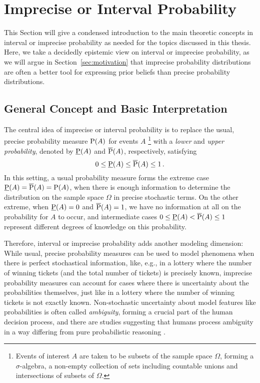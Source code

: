 

\section{Imprecise or Interval Probability}
\label{sec:ip-intro}

This Section will give a condensed introduction to the main theoretic concepts
in interval or imprecise probability as needed for the topics discussed in this thesis.
Here, we take a decidedly epistemic view on interval or imprecise probability,
as we will argue in Section~\ref{sec:motivation}
that imprecise probability distributions are often a better tool for expressing prior beliefs
than precise probability distributions.



\subsection{General Concept and Basic Interpretation}
\label{sec:ip-general}

The central idea of imprecise or interval probability \parencite{1991:walley, 2001:weichselberger, 2011:IESS-ip} is
to replace the usual, precise probability measure $\operatorname{P}(A)$ for events $A$%
\footnote{Events of interest $A$ are taken to be subsets of the sample space $\Omega$,
forming a $\sigma$-algebra, a non-empty collection of sets including countable unions and intersections of subsets of $\Omega$.}
with a \emph{lower} and \emph{upper probability}, denoted by $\underline{\operatorname{P}}(A)$ and $\overline{\operatorname{P}}(A)$, respectively,
satisfying
\begin{equation}
\label{eq:0ip1}
0 \le \underline{\operatorname{P}}(A) \le \overline{\operatorname{P}}(A) \le 1\,.
\end{equation}
In this setting, a usual probability measure forms the extreme case $\underline{\operatorname{P}}(A) = \overline{\operatorname{P}}(A) = \operatorname{P}(A)$,
when there is enough information to determine the distribution on the sample space $\Omega$
in precise stochastic terms.
On the other extreme, when $\underline{\operatorname{P}}(A) = 0$ and $\overline{\operatorname{P}}(A) = 1$,
we have no information at all on the probability for $A$ to occur,
and intermediate cases $0 \le \underline{\operatorname{P}}(A) < \overline{\operatorname{P}}(A) \le 1$ represent
different degrees of knowledge on this probability.

Therefore, interval or imprecise probability adds another modeling dimension:
While usual, precise probability measures can be used to model phenomena when there is perfect stochastical information,
like, e.g., in a lottery where the number of winning tickets (and the total number of tickets) is precisely known,
imprecise probability measures can account for cases where there is uncertainty about the probabilities themselves,
just like in a lottery where the number of winning tickets is not exactly known.
Non-stochastic uncertainty about model features like probabilities is often called \emph{ambiguity},
forming a crucial part of the human decision process,
and there are studies suggesting that humans process ambiguity in a way
differing from pure probabilistic reasoning \parencite{2005:hsu-bhatt}.

